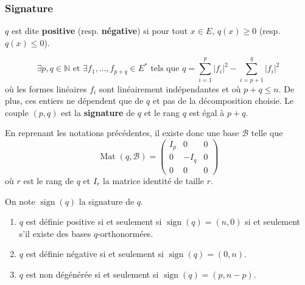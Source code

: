 	\subsubsection{Signature}
	
	\begin{definition}
		$q$ est dite \textbf{positive} (resp. \textbf{négative}) si pour tout $x \in E$, $q(x) \geq 0$ (resp. $q(x) \leq 0$).
	\end{definition}
	
	
	\begin{theorem}
		\[ \exists p, q \in \mathbb{N} \text{ et } \exists f_1, \dots, f_{p+q} \in E^* \text{ tels que } q = \sum_{i=1}^p |f_i|^2 - \sum_{i=p+1}^q |f_i|^2 \]
		où les formes linéaires $f_i$ sont linéairement indépendantes et où $p + q \leq n$. De plus, ces entiers ne dépendent que de $q$ et pas de la décomposition choisie.
		\newpar
		Le couple $(p,q)$ est la \textbf{signature} de $q$ et le rang $q$ est égal à $p+q$.
	\end{theorem}
	
	\begin{remark}
		En reprenant les notations précédentes, il existe donc une base $\mathcal{B}$ telle que
		\[
		\operatorname{Mat}(q, \mathcal{B}) =
		\begin{pmatrix}
			I_p & 0 & 0 \\
			0 & -I_q & 0 \\
			0 & 0 & 0
		\end{pmatrix}
		\]
		où $r$ est le rang de $q$ et $I_r$ la matrice identité de taille $r$.
	\end{remark}
	
	
	\begin{corollary}
		On note $\operatorname{sign}(q)$ la signature de $q$.
		\begin{enumerate}[label=(\roman*)]
			\item $q$ est définie positive si et seulement si $\operatorname{sign}(q) = (n, 0)$ si et seulement s'il existe des bases $q$-orthonormées.
			\item $q$ est définie négative si et seulement si $\operatorname{sign}(q) = (0, n)$.
			\item $q$ est non dégénérée si et seulement si $\operatorname{sign}(q) = (p, n-p)$.
		\end{enumerate}
	\end{corollary}
	
